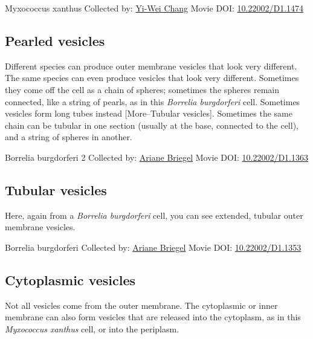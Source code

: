 \documentclass[]{tufte-book}
\begin{document}
\hypertarget{htmlwidget-1ea2019c488db37449e4}{}

\label{fig:2-4}Myxococcus xanthus Collected by: \protect\hyperlink{yi-wei_chang}{Yi-Wei Chang} Movie DOI: \href{https://doi.org/10.22002/D1.1474}{10.22002/D1.1474}

\hypertarget{Pearled_vesicles}{%
\subsection{Pearled vesicles}\label{Pearled_vesicles}}

Different species can produce outer membrane vesicles that look very different. The same species can even produce vesicles that look very different. Sometimes they come off the cell as a chain of spheres; sometimes the spheres remain connected, like a string of pearls, as in this \emph{Borrelia burgdorferi} cell. Sometimes vesicles form long tubes instead {[}More--Tubular vesicles{]}. Sometimes the same chain can be tubular in one section (usually at the base, connected to the cell), and a string of spheres in another.



\hypertarget{htmlwidget-9ba6659d9e8b49c49951}{}

\label{fig:2-4a}Borrelia burgdorferi 2 Collected by: \protect\hyperlink{ariane_briegel}{Ariane Briegel} Movie DOI: \href{https://doi.org/10.22002/D1.1363}{10.22002/D1.1363}

\hypertarget{Tubular_vesicles}{%
\subsection{Tubular vesicles}\label{Tubular_vesicles}}

Here, again from a \emph{Borrelia burgdorferi} cell, you can see extended, tubular outer membrane vesicles.



\hypertarget{htmlwidget-9550e3ecbcb6a7bf0cad}{}

\label{fig:2-4b}Borrelia burgdorferi Collected by: \protect\hyperlink{ariane_briegel}{Ariane Briegel} Movie DOI: \href{https://doi.org/10.22002/D1.1353}{10.22002/D1.1353}

\hypertarget{Cytoplasmic_vesicles}{%
\subsection{Cytoplasmic vesicles}\label{Cytoplasmic_vesicles}}

Not all vesicles come from the outer membrane. The cytoplasmic or inner membrane can also form vesicles that are released into the cytoplasm, as in this \emph{Myxococcus xanthus} cell, or into the periplasm.
\end{document}
